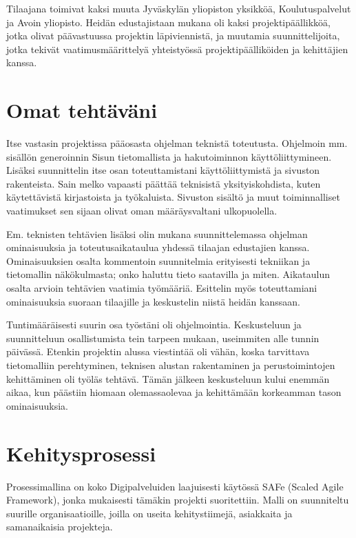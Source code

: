 \documentclass{article}
\begin{document}
Tilaajana toimivat kaksi muuta Jyväskylän yliopiston yksikköä,
Koulutuspalvelut ja Avoin yliopisto. Heidän edustajistaan mukana oli kaksi
projektipäällikköä, jotka olivat päävastuussa projektin läpiviennistä, ja
muutamia suunnittelijoita, jotka tekivät vaatimusmäärittelyä yhteistyössä
projektipäälliköiden ja kehittäjien kanssa.

\section{Omat tehtäväni}

Itse vastasin projektissa pääosasta ohjelman teknistä toteutusta. Ohjelmoin mm.
sisällön generoinnin Sisun tietomallista ja hakutoiminnon käyttöliittymineen.
Lisäksi suunnittelin itse osan toteuttamistani käyttöliittymistä ja sivuston
rakenteista. Sain melko vapaasti päättää teknisistä yksityiskohdista, kuten
käytettävistä kirjastoista ja työkaluista. Sivuston sisältö ja muut
toiminnalliset vaatimukset sen sijaan olivat oman määräysvaltani ulkopuolella.

Em. teknisten tehtävien lisäksi olin mukana suunnittelemassa ohjelman
ominaisuuksia ja toteutusaikataulua yhdessä tilaajan edustajien kanssa.
Ominaisuuksien osalta kommentoin suunnitelmia erityisesti tekniikan ja
tietomallin näkökulmasta; onko haluttu tieto saa\-ta\-vil\-la ja mi\-ten.
Aikataulun osalta arvioin tehtävien vaatimia työmääriä. Esittelin myös
toteuttamiani ominaisuuksia suoraan tilaajille ja keskustelin niistä heidän
kanssaan.

Tuntimääräisesti suurin osa työstäni oli ohjelmointia. Keskusteluun ja
suunnitteluun osallistumista tein tarpeen mukaan, useimmiten alle tunnin
päivässä. Etenkin projektin alussa viestintää oli vähän, koska tarvittava
tietomalliin perehtyminen, teknisen alustan rakentaminen ja perustoimintojen
kehittäminen oli työläs tehtävä. Tämän jälkeen keskusteluun kului enemmän
aikaa, kun päästiin hio\-maan olemassaolevaa ja kehittämään korkeamman tason
ominaisuuksia.

\section{Kehitysprosessi}

Prosessimallina on koko Digipalveluiden laajuisesti käytössä SAFe (Scaled Agile
Framework), jonka mu\-kai\-ses\-ti tämäkin projekti suoritettiin. Malli on
suunniteltu suurille organisaatioille, joilla on useita kehitystiimejä,
asiakkaita ja samanaikaisia projekteja.
\end{document}
